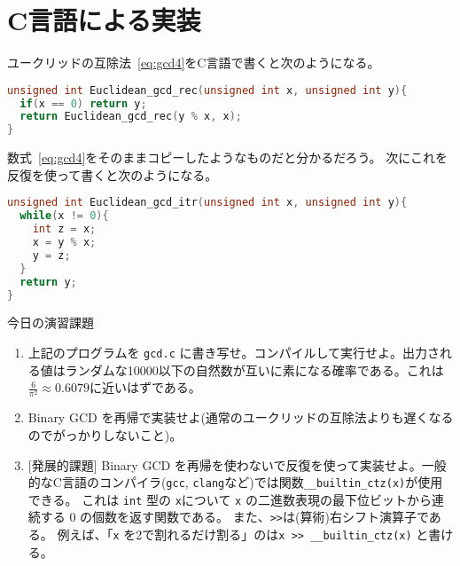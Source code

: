 \documentclass[a4paper,twoside,onecolumn,openany,article,10pt]{memoir}
\theoremstyle{remark}
\begin{document}
\section{C言語による実装}
ユークリッドの互除法~\eqref{eq:gcd4}をC言語で書くと次のようになる。
\begin{lstlisting}[basicstyle=\ttfamily\normalsize,showstringspaces=false,language=C,frame=single]
unsigned int Euclidean_gcd_rec(unsigned int x, unsigned int y){
  if(x == 0) return y;
  return Euclidean_gcd_rec(y % x, x);
}
\end{lstlisting}
数式~\eqref{eq:gcd4}をそのままコピーしたようなものだと分かるだろう。
次にこれを反復を使って書くと次のようになる。
\begin{lstlisting}[basicstyle=\ttfamily\normalsize,showstringspaces=false,language=C,frame=single]
unsigned int Euclidean_gcd_itr(unsigned int x, unsigned int y){
  while(x != 0){
    int z = x;
    x = y % x;
    y = z;
  }
  return y;
}
\end{lstlisting}

\vspace{3em}
\noindent
今日の演習課題
\begin{enumerate}
\item 上記のプログラムを \texttt{gcd.c} に書き写せ。コンパイルして実行せよ。出力される値はランダムな10000以下の自然数が互いに素になる確率である。これは$\frac6{\pi^2}\approx 0.6079$に近いはずである。
\item Binary GCD を再帰で実装せよ(通常のユークリッドの互除法よりも遅くなるのでがっかりしないこと)。
\item {[発展的課題]} Binary GCD を再帰を使わないで反復を使って実装せよ。一般的なC言語のコンパイラ(\texttt{gcc}, \texttt{clang}など)では関数\texttt{\_\_builtin\_ctz(x)}が使用できる。
これは \texttt{int} 型の \texttt{x}について \texttt{x} の二進数表現の最下位ビットから連続する 0 の個数を返す関数である。
また、\texttt{>{}>}は(算術)右シフト演算子である。
例えば、「\texttt{x} を2で割れるだけ割る」のは\texttt{x >{}> \_\_builtin\_ctz(x)} と書ける。
\end{enumerate}
\fi
\end{document}
